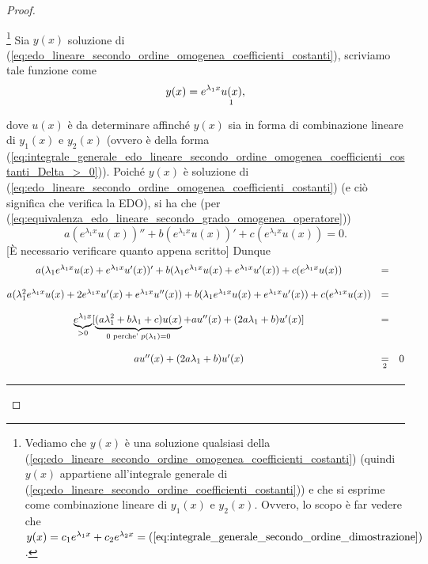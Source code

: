\begin{proof}
\begin{enumerate}
		\footnote{Vediamo che $y(x)$ è una soluzione qualsiasi della (\ref{eq:edo_lineare_secondo_ordine_omogenea_coefficienti_costanti}) (quindi $y(x)$ appartiene all'integrale generale di (\ref{eq:edo_lineare_secondo_ordine_coefficienti_costanti})) e che si esprime come combinazione lineare di $y_1(x)$ e $y_2(x)$. Ovvero, lo scopo è far vedere che $y(x)=c_1 e^{\lambda_1x}+c_2e^{\lambda_2 x}=(\ref{eq:integrale_generale_secondo_ordine_dimostrazione})$.} Sia $y(x)$ soluzione di  (\ref{eq:edo_lineare_secondo_ordine_omogenea_coefficienti_costanti}), scriviamo tale funzione come
		\begin{equation}\label{eq:integrale_generale_secondo_ordine_dimostrazione}
			y(x) = e^{\lambda_1 x}\underset{\footnotemark}{u(x)},
		\end{equation}
		dove $u(x)$ è da determinare affinché $y(x)$ sia in forma di combinazione lineare di $y_1(x)$ e $y_2(x)$ (ovvero è della forma (\ref{eq:integrale_generale_edo_lineare_secondo_ordine_omogenea_coefficienti_costanti_Delta_>_0})).
		Poiché $y(x)$ è soluzione di  (\ref{eq:edo_lineare_secondo_ordine_omogenea_coefficienti_costanti}) (e ciò significa che verifica la EDO), si ha che (per (\ref{eq:equivalenza_edo_lineare_secondo_grado_omogenea_operatore}))
		\begin{equation*}
			a(e^{\lambda_1x}u(x))''+ b(e^{\lambda_1x}u(x))'+ c (e^{\lambda_1x}u(x)) = 0.
		\end{equation*}
		[È necessario verificare quanto appena scritto] Dunque
		\begin{equation}\label{eq:dimostrazione_th_soluzioni_edo_secondo_ordine}
			\begin{matrix}
				a(\lambda_1e^{\lambda_1x}u(x)+e^{\lambda_1x}u'(x))' + b(\lambda_1 e^{\lambda_1 x}u(x) + e^{\lambda_1x}u'(x)) + c(e^{\lambda_1x}u(x)) &=&\\\\
				a(\lambda_1^2e^{\lambda_1 x}u(x) + 2 e^{\lambda_1 x} u'(x) + e^{\lambda_1 x}u''(x))+ b (\lambda_1 e^{\lambda_1 x}u(x) + e^{\lambda_1 x}u'(x)) + 
				c(e^{\lambda_1 x}u(x)) &=&\\\\
				 \underbrace{e^{\lambda_1 x}}_{>0} [\underbrace{(a\lambda_1^2+b\lambda_1 +c) u(x)}_{0\text{ perche' } p(\lambda_1)=0} + a u''(x)+(2a\lambda_1 + b)u'(x)]&=&\\\\
				 a u''(x)+(2a\lambda_1 + b)u'(x) &\underset{\footnotemark}{=}& 0
			\end{matrix}
		\end{equation}
		\hrule\vspace{-12px}

\end{enumerate}
\end{proof}
